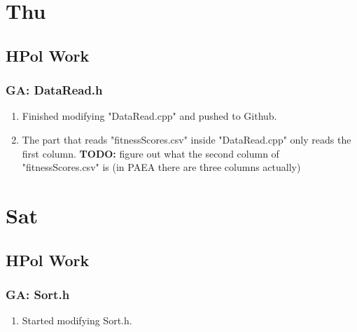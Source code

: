 \documentclass[12pt,letterpaper]{article}
\begin{document}
\newpage
\setcounter{section}{5}

\section{Thu}
\subsection{HPol Work}
\subsubsection{GA: DataRead.h}
\begin{enumerate}
  \item Finished modifying "DataRead.cpp" and pushed to Github.
  \item The part that reads "fitnessScores.csv" inside "DataRead.cpp" only reads the 
    first column. \textbf{TODO:} figure out what the second column of "fitnessScores.csv"
    is (in PAEA there are three columns actually)
\end{enumerate}

\newpage
\setcounter{section}{7}

\section{Sat}
\subsection{HPol Work}
\subsubsection{GA: Sort.h}
\begin{enumerate}
  \item Started modifying Sort.h.
\end{enumerate}
\end{document}
